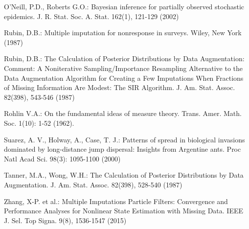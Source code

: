 \documentclass[9pt, xcolor={dvipsnames,svgnames,table}]{beamer}
\begin{document}
\begin{frame}[shrink=15]
\begin{thebibliography}{}
{
O'Neill, P.D., Roberts G.O.: Bayesian inference for partially observed stochastic epidemics. J. R. Stat. Soc. A. Stat. 162(1), 121-129 (2002)

Rubin, D.B.: Multiple imputation for nonresponse in surveys. Wiley, New York (1987)

Rubin, D.B.: The Calculation of Posterior Distributions by Data Augmentation: Comment: A Noniterative Sampling/Importance Resampling Alternative to the Data Augmentation Algorithm for Creating a Few Imputations When Fractions of Missing Information Are Modest: The SIR Algorithm. J. Am. Stat. Assoc. 82(398), 543-546 (1987)

Rohlin V.A.: On the fundamental ideas of measure theory.  Trans.
Amer. Math. Soc. 1(10): 1-52 (1962).

 Suarez, A. V., Holway, A., Case, T. J.: Patterns of spread in biological invasions dominated by long-distance jump dispersal: Insights from Argentine ants. Proc Natl Acad Sci. 98(3): 1095-1100  (2000)

Tanner, M.A., Wong, W.H.: The Calculation of Posterior Distributions by Data Augmentation. J. Am. Stat. Assoc. 82(398), 528-540 (1987)

Zhang, X-P. et al.: Multiple Imputations Particle Filters: Convergence and Performance Analyses for Nonlinear State Estimation with Missing Data. IEEE J. Sel. Top Signa. 9(8), 1536-1547 (2015)}

\end{thebibliography}
\end{frame}
\end{document}
